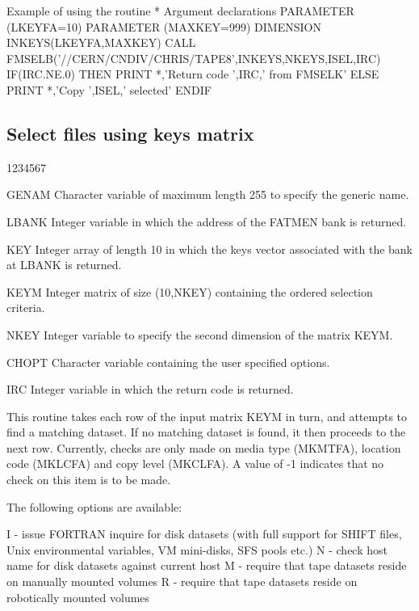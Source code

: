 \begin{XMPt}{Example of using the \protect{} routine}
*     Argument declarations
      PARAMETER (LKEYFA=10)
      PARAMETER (MAXKEY=999)
      DIMENSION INKEYS(LKEYFA,MAXKEY)
      CALL FMSELB('//CERN/CNDIV/CHRIS/TAPE8',INKEYS,NKEYS,ISEL,IRC)
      IF(IRC.NE.0) THEN
         PRINT *,'Return code ',IRC,' from FMSELK'
      ELSE
         PRINT *,'Copy ',ISEL,' selected'
      ENDIF
\end{XMPt}
\subsection{Select files using keys matrix}
\begin{DLtt}{1234567}
\item[GENAM]
Character variable of maximum length 255 to specify the generic name.
\item[LBANK]
Integer variable in which the address of the FATMEN bank is returned.
\item[KEY]
Integer array of length 10 in which the keys vector associated with
the bank at LBANK is returned.
\item[KEYM]
Integer matrix of size (10,NKEY) containing the ordered selection
criteria.
\item[NKEY]
Integer variable to specify the second dimension of
the matrix KEYM.
\item[CHOPT]
Character variable containing the user specified options.
\item[IRC]
Integer variable in which the return code is returned.
\end{DLtt}
\par
This routine takes each row of the input matrix KEYM in turn,
and attempts to find a matching dataset. If no matching dataset
is found, it then proceeds to the next row.
Currently, checks are only made on media type (MKMTFA), location code
(MKLCFA) and copy level (MKCLFA). A value of -1 indicates that no
check on this item is to be made.
\par
The following options are available:
\begin{XMP}
   I - issue FORTRAN inquire for disk datasets (with full support
       for SHIFT files, Unix environmental variables, VM mini-disks,
       SFS pools etc.)
   N - check host name for disk datasets against current host
   M - require that tape datasets reside on manually mounted volumes
   R - require that tape datasets reside on robotically mounted volumes
\end{XMP}
